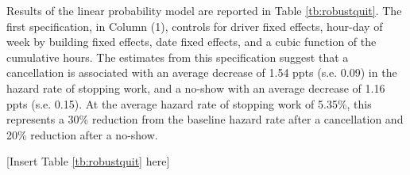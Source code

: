 \documentclass[reviewmode,AEJ]{AEA}
\begin{document}
Results of the linear probability model are reported in Table \ref{tb:robustquit}. 
The first specification, in Column (1), controls for driver fixed effects, hour-day of week by building fixed effects, date fixed effects, and a cubic function of the cumulative hours.
The estimates from this specification suggest that a cancellation is associated with an
average decrease of 1.54 ppts (s.e. 0.09) in the hazard rate of stopping work, and a no-show with an average decrease
of 1.16 ppts (s.e. 0.15). At the average hazard rate of stopping work of 5.35\%, this represents a 30\% reduction from the baseline hazard rate after a cancellation and 20\% reduction after a no-show.

\begin{center}
	[Insert Table \ref{tb:robustquit} here]
\end{center}

\end{document}
